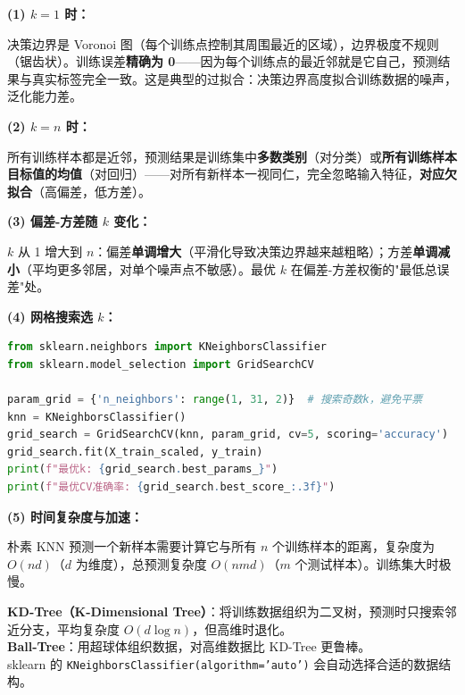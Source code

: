 \documentclass[a4paper,11pt]{ctexart}
\begin{document}
\begin{solutionbox}[参考答案与详细解析]
    \textbf{(1) $k=1$ 时：}

    决策边界是 Voronoi 图（每个训练点控制其周围最近的区域），边界极度不规则（锯齿状）。训练误差\textbf{精确为 0}——因为每个训练点的最近邻就是它自己，预测结果与真实标签完全一致。这是典型的过拟合：决策边界高度拟合训练数据的噪声，泛化能力差。

    \textbf{(2) $k=n$ 时：}

    所有训练样本都是近邻，预测结果是训练集中\textbf{多数类别}（对分类）或\textbf{所有训练样本目标值的均值}（对回归）——对所有新样本一视同仁，完全忽略输入特征，\textbf{对应欠拟合}（高偏差，低方差）。

    \textbf{(3) 偏差-方差随 $k$ 变化：}

    $k$ 从 1 增大到 $n$：偏差\textbf{单调增大}（平滑化导致决策边界越来越粗略）；方差\textbf{单调减小}（平均更多邻居，对单个噪声点不敏感）。最优 $k$ 在偏差-方差权衡的"最低总误差"处。

    \textbf{(4) 网格搜索选 $k$：}
    \begin{lstlisting}[language=Python]
from sklearn.neighbors import KNeighborsClassifier
from sklearn.model_selection import GridSearchCV

param_grid = {'n_neighbors': range(1, 31, 2)}  # 搜索奇数k，避免平票
knn = KNeighborsClassifier()
grid_search = GridSearchCV(knn, param_grid, cv=5, scoring='accuracy')
grid_search.fit(X_train_scaled, y_train)
print(f"最优k: {grid_search.best_params_}")
print(f"最优CV准确率: {grid_search.best_score_:.3f}")
    \end{lstlisting}

    \textbf{(5) 时间复杂度与加速：}

    朴素 KNN 预测一个新样本需要计算它与所有 $n$ 个训练样本的距离，复杂度为 $O(nd)$（$d$ 为维度），总预测复杂度 $O(nmd)$（$m$ 个测试样本）。训练集大时极慢。

    \begin{keybox}
        \textbf{KD-Tree（K-Dimensional Tree）}：将训练数据组织为二叉树，预测时只搜索邻近分支，平均复杂度 $O(d\log n)$，但高维时退化。\\
        \textbf{Ball-Tree}：用超球体组织数据，对高维数据比 KD-Tree 更鲁棒。\\
        sklearn 的 \texttt{KNeighborsClassifier(algorithm='auto')} 会自动选择合适的数据结构。
    \end{keybox}
\end{solutionbox}
\end{document}
